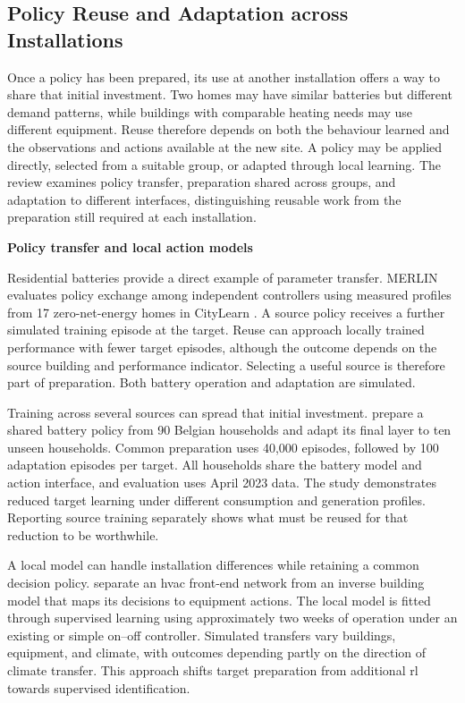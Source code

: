 \subsection{Policy Reuse and Adaptation across Installations}
\label{sec:ch3-transfer}

Once a policy has been prepared, its use at another installation offers a way to share that initial investment. Two homes may have similar batteries but different demand patterns, while buildings with comparable heating needs may use different equipment. Reuse therefore depends on both the behaviour learned and the observations and actions available at the new site. A policy may be applied directly, selected from a suitable group, or adapted through local learning. The review examines policy transfer, preparation shared across groups, and adaptation to different interfaces, distinguishing reusable work from the preparation still required at each installation.

\smallskip
\noindent\textbf{Policy transfer and local action models}\par\nobreak\smallskip
Residential batteries provide a direct example of parameter transfer. MERLIN evaluates policy exchange among independent controllers using measured profiles from 17 zero-net-energy homes in CityLearn \parencite{nweye2023merlin}. A source policy receives a further simulated training episode at the target. Reuse can approach locally trained performance with fewer target episodes, although the outcome depends on the source building and performance indicator. Selecting a useful source is therefore part of preparation. Both battery operation and adaptation are simulated.

Training across several sources can spread that initial investment. \textcite{madahi2024multisource} prepare a shared battery policy from 90 Belgian households and adapt its final layer to ten unseen households. Common preparation uses 40,000 episodes, followed by 100 adaptation episodes per target. All households share the battery model and action interface, and evaluation uses April 2023 data. The study demonstrates reduced target learning under different consumption and generation profiles. Reporting source training separately shows what must be reused for that reduction to be worthwhile.

A local model can handle installation differences while retaining a common decision policy. \textcite{xu2020oneformany} separate an \gls{hvac} front-end network from an inverse building model that maps its decisions to equipment actions. The local model is fitted through supervised learning using approximately two weeks of operation under an existing or simple on--off controller. Simulated transfers vary buildings, equipment, and climate, with outcomes depending partly on the direction of climate transfer. This approach shifts target preparation from additional \gls{rl} towards supervised identification.

